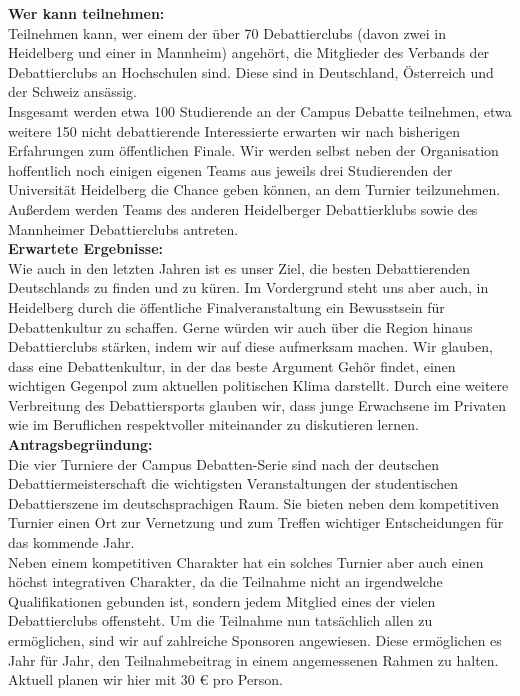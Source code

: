 {    \textbf{Wer kann teilnehmen:}\\
    Teilnehmen kann, wer einem der über 70 Debattierclubs (davon zwei in Heidelberg und einer in Mannheim) angehört, die Mitglieder des Verbands der Debattierclubs an Hochschulen sind. Diese sind in Deutschland, Österreich und der Schweiz ansässig.\\
    Insgesamt werden etwa 100 Studierende an der Campus Debatte teilnehmen, etwa weitere 150 nicht debattierende Interessierte erwarten wir nach bisherigen Erfahrungen zum öffentlichen Finale. Wir werden selbst neben der Organisation hoffentlich noch einigen eigenen Teams aus jeweils drei Studierenden der Universität Heidelberg die Chance geben können, an dem Turnier teilzunehmen.\\
    Außerdem werden Teams des anderen Heidelberger Debattierklubs sowie des Mannheimer Debattierclubs antreten.\\[1em]
    \textbf{Erwartete Ergebnisse:}\\
    Wie auch in den letzten Jahren ist es unser Ziel, die besten Debattierenden Deutschlands zu finden und zu küren. Im Vordergrund steht uns aber auch, in Heidelberg durch die öffentliche Finalveranstaltung ein Bewusstsein für Debattenkultur zu schaffen. Gerne würden wir auch über die Region hinaus Debattierclubs stärken, indem wir auf diese aufmerksam machen. Wir glauben, dass eine Debattenkultur, in der das beste Argument Gehör findet, einen wichtigen Gegenpol zum aktuellen politischen Klima darstellt. Durch eine weitere Verbreitung des Debattiersports glauben wir, dass junge Erwachsene im Privaten wie im Beruflichen respektvoller miteinander zu diskutieren lernen.\\[1em]
    \textbf{Antragsbegründung:}\\
    Die vier Turniere der Campus Debatten-Serie sind nach der deutschen Debattiermeisterschaft die wichtigsten Veranstaltungen der studentischen Debattierszene im deutschsprachigen Raum. Sie bieten neben dem kompetitiven Turnier einen Ort zur Vernetzung und zum Treffen wichtiger Entscheidungen für das kommende Jahr.\\
    Neben einem kompetitiven Charakter hat ein solches Turnier aber auch einen höchst integrativen Charakter, da die Teilnahme nicht an irgendwelche Qualifikationen gebunden ist, sondern jedem Mitglied eines der vielen Debattierclubs offensteht. Um die Teilnahme nun tatsächlich allen zu ermöglichen, sind wir auf zahlreiche Sponsoren angewiesen. Diese ermöglichen es Jahr für Jahr, den Teilnahmebeitrag in einem angemessenen Rahmen zu halten. Aktuell planen wir hier mit 30 € pro Person.\\[1em]
}
